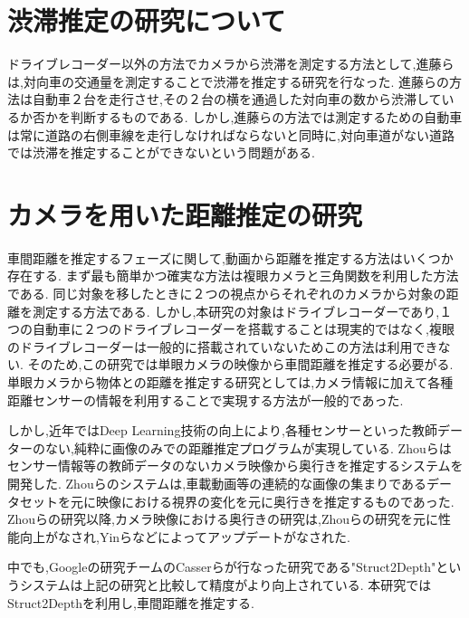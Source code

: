 \newpage

\section{渋滞推定の研究について}
ドライブレコーダー以外の方法でカメラから渋滞を測定する方法として,進藤ら\cite{進藤瞭2013車載カメラ画像を用いた対向車線の渋滞状況の把握手法}は,対向車の交通量を測定することで渋滞を推定する研究を行なった.
進藤らの方法は自動車２台を走行させ,その２台の横を通過した対向車の数から渋滞しているか否かを判断するものである.
しかし,進藤らの方法では測定するための自動車は常に道路の右側車線を走行しなければならないと同時に,対向車道がない道路では渋滞を推定することができないという問題がある.

\section{カメラを用いた距離推定の研究}
車間距離を推定するフェーズに関して,動画から距離を推定する方法はいくつか存在する.
まず最も簡単かつ確実な方法は複眼カメラと三角関数を利用した方法である.
同じ対象を移したときに２つの視点からそれぞれのカメラから対象の距離を測定する方法である.
しかし,本研究の対象はドライブレコーダーであり,１つの自動車に２つのドライブレコーダーを搭載することは現実的ではなく,複眼のドライブレコーダーは一般的に搭載されていないためこの方法は利用できない.
そのため,この研究では単眼カメラの映像から車間距離を推定する必要がる.
単眼カメラから物体との距離を推定する研究としては,カメラ情報に加えて各種距離センサーの情報を利用することで実現する方法が一般的であった.

しかし,近年ではDeep Learning技術の向上により,各種センサーといった教師データーのない,純粋に画像のみでの距離推定プログラムが実現している.
Zhouら\cite{zhou2017unsupervised}はセンサー情報等の教師データのないカメラ映像から奥行きを推定するシステムを開発した.
Zhouらのシステムは,車載動画等の連続的な画像の集まりであるデータセットを元に映像における視界の変化を元に奥行きを推定するものであった.
Zhouらの研究以降,カメラ映像における奥行きの研究は,Zhouらの研究を元に性能向上がなされ,Yinら\cite{yin2018geonet}などによってアップデートがなされた.

中でも,Googleの研究チームのCasserらが行なった研究である"Struct2Depth"\cite{casser2019struct2depth}というシステムは上記の研究と比較して精度がより向上されている.
本研究ではStruct2Depthを利用し,車間距離を推定する.

\newpage

